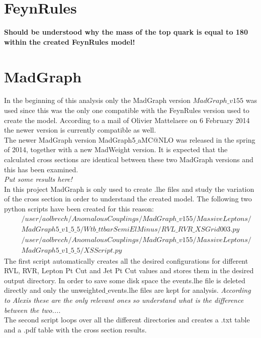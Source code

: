 \section{FeynRules}
\textbf{Should be understood why the mass of the top quark is equal to 180 within the created FeynRules model!}

\section{MadGraph}

In the beginning of this analysis only the MadGraph version $MadGraph\_v155$ was used since this was the only one compatible with the FeynRules version used to create the model. According to a mail of Olivier Mattelaere on 6 February 2014 the newer version is currently compatible as well.\\
The newer MadGraph version MadGraph5$\_$aMC@NLO was released in the spring of 2014, together with a new MadWeight version. It is expected that the calculated cross sections are identical between these two MadGraph versions and this has been examined.\\
\textit{Put some results here!}\\

In this project MadGraph is only used to create .lhe files and study the variation of the cross section in order to understand the created model. The following two python scripts have been created for this reason:
\begin{eqnarray*}
  & & /user/aolbrech/AnomalousCouplings/MadGraph\_v155/MassiveLeptons/\\ & & MadGraph5\_v1\_5\_5/Wtb\_ttbarSemiElMinus/RVL\_RVR\_XSGrid003.py \\
  & & /user/aolbrech/AnomalousCouplings/MadGraph\_v155/MassiveLeptons/\\ & & MadGraph5\_v1\_5\_5/XSScript.py
\end{eqnarray*}
The first script automatically creates all the desired configurations for different RVL, RVR, Lepton Pt Cut and Jet Pt Cut values and stores them in the desired output directory.
In order to save some disk space the events.lhe file is deleted directly and only the unweighted$\_$events.lhe files are kept for analysis. \textit{According to Alexis these are the only relevant ones so understand what is the difference between the two...}.\\
The second script loops over all the different directories and creates a .txt table and a .pdf table with the cross section results.\\

